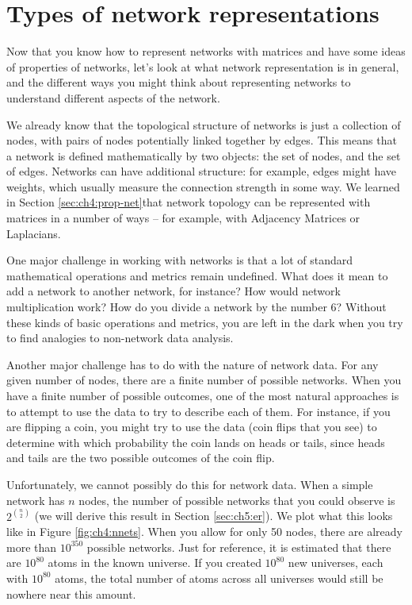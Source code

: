 \section{Types of network representations}
\label{sec:ch4:net-rep}

Now that you know how to represent networks with matrices and have some ideas of properties of networks, let's look at what network representation is in general, and the different ways you might think about representing networks to understand different aspects of the network.

We already know that the topological structure of networks is just a collection of nodes, with pairs of nodes potentially linked together by edges. This means that a network is defined mathematically by two objects: the set of nodes, and the set of edges. Networks can have additional structure: for example, edges might have weights, which usually measure the connection strength in some way. We learned in 
Section \ref{sec:ch4:prop-net}that network topology can be represented with matrices in a number of ways -- for example, with Adjacency Matrices or Laplacians.

One major challenge in working with networks is that a lot of standard mathematical operations and metrics remain undefined. What does it mean to add a network to another network, for instance? How would network multiplication work? How do you divide a network by the number 6? Without these kinds of basic operations and metrics, you are left in the dark when you try to find analogies to non-network data analysis.

Another major challenge has to do with the nature of network data. For any given number of nodes, there are a finite number of possible networks. When you have a finite number of possible outcomes, one of the most natural approaches is to attempt to use the data to try to describe each of them. For instance, if you are flipping a coin, you might try to use the data (coin flips that you see) to determine with which probability the coin lands on heads or tails, since heads and tails are the two possible outcomes of the coin flip.

Unfortunately, we cannot possibly do this for network data. When a simple network has $n$ nodes, the number of possible networks that you could observe is $2^{\binom n 2}$ (we will derive this result in Section \ref{sec:ch5:er}). We plot what this looks like in Figure \ref{fig:ch4:nnets}. When you allow for only 50 nodes, there are already more than $10^{350}$ possible networks. Just for reference, it is estimated that there are $10^{80}$ atoms in the known universe. If you created $10^{80}$ new universes, each with $10^{80}$ atoms, the total number of atoms across all universes would still be nowhere near this amount. 

